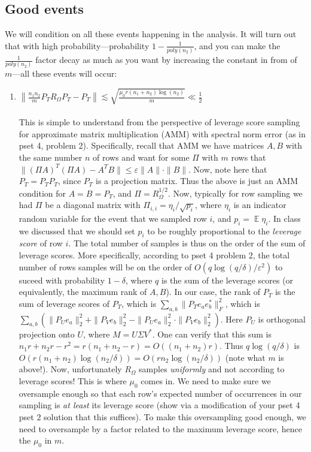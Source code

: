 \documentclass[11pt]{article}
\DeclareMathOperator*{\E}{\mathbb{E}}
\newcommand{\norm}[1]{\left\| #1 \right\|}
\newcommand{\eps}{\varepsilon}
\begin{document}
\subsection{Good events}
We will condition on all these events happening in the analysis. It will turn out that with high probability---probability $1 - \frac{1}{poly(n_2)}$, and you can make the $\frac{1}{poly(n_2)}$ factor decay as much as you want by increasing the constant in from of $m$---all these events will occur:
\begin{enumerate}
\item $\norm{\frac{n_1 n_2}{m} P_T R_\Omega P_T - P_T  } \lesssim \sqrt{ \frac{\mu_0 r(n_1 + n_2) \log(n_2)}{m}  } \ll \frac{1}{2}$ \\ \\ This is simple to understand from the perspective of leverage score sampling for approximate matrix multiplication (AMM) with spectral norm error (as in pset 4, problem 2). Specifically, recall that AMM we have matrices $A, B$ with the same number $n$ of rows and want for some $\Pi$ with $m$ rows that $\|(\Pi A)^T(\Pi A) - A^T B\| \le \eps \|A\|\cdot \|B\|$. Now, note here that $P_T = P_T P_T$, since $P_T$ is a projection matrix. Thus the above is just an AMM condition for $A = B = P_T$, and $\Pi = R_\Omega^{1/2}$. Now, typically for row sampling we had $\Pi$ be a diagonal matrix with $\Pi_{i,i} = \eta_i/\sqrt{p_i}$, where $\eta_i$ is an indicator random variable for the event that we sampled row $i$, and $p_i = \E \eta_i$. In class we discussed that we should set $p_i$ to be roughly proportional to the {\em leverage score} of row $i$. The total number of samples is thus on the order of the sum of leverage scores. More specifically, according to pset 4 problem 2, the total number of rows samples will be on the order of $O(q\log(q/\delta)/\eps^2)$ to suceed with probability $1-\delta$, where $q$ is the sum of the leverage scores (or equivalently, the maximum rank of $A, B$). In our case, the rank of $P_T$ is the sum of leverage scores of $P_T$, which is $\sum_{a,b} \|P_T e_ae_b^*\|_F^2$, which is $\sum_{a,b} (\|P_U e_a\|_2^2 + \|P_V e_b\|_2^2 - \|P_U e_a\|_2^2\cdot\|P_V e_b\|_2^2)$. Here $P_U$ is orthogonal projection onto $U$, where $M = U \Sigma V^*$. One can verify that this sum is $n_1r + n_2r - r^2 = r(n_1 + n_2 -r) = O((n_1 + n_2)r)$. Thus $q\log(q/\delta)$ is $O(r(n_1 + n_2)\log(n_2/\delta)) = O(rn_2\log(n_2/\delta))$ (note what $m$ is above!). Now, unfortunately $R_\Omega$ samples {\em uniformly} and not according to leverage scores! This is where $\mu_0$ comes in. We need to make sure we oversample enough so that each row's expected number of occurrences in our sampling is {\em at least} its leverage score (show via a modification of your pset 4 pset 2 solution that this suffices). To make this oversampling good enough, we need to oversample by a factor related to the maximum leverage score, hence the $\mu_0$ in $m$.

\end{enumerate}
\end{document}
